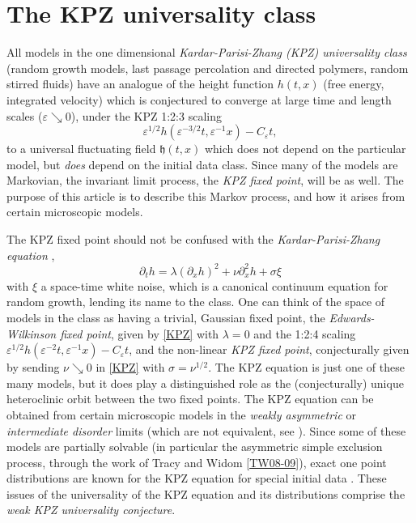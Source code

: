 \documentclass[letterpaper,reqno,11pt,oneside,final]{amsart}
\makeatletter
\newcommand{\citelink}[2]{\hyperlink{cite.\therefsection @#1}{#2}}
\theoremstyle{definition}
\newcommand{\fh}{\mathfrak{h}}
\newcommand{\ep}{\varepsilon}
\numberwithin{equation}{section}
\makeatother
\begin{document}
\maketitle
\tableofcontents


\section{The KPZ universality class}

All models in the one dimensional \emph{Kardar-Parisi-Zhang (KPZ) universality class} (random growth models, last passage percolation and directed polymers, random stirred fluids) have an analogue of the height function $h(t,x)$ (free energy, integrated velocity) which is conjectured to converge at large time and length scales ($\ep\searrow 0$), under the KPZ 1:2:3 scaling  
\begin{equation}\label{123}
\ep^{1/2} h(\ep^{-3/2} t, \ep^{-1} x) - C_\ep t, 
\end{equation}
to a universal fluctuating field $\fh(t,x)$ which does not depend on the particular model, but \emph{does} depend on the initial data class.  
Since many of the models are Markovian, the invariant limit process, the \emph{KPZ fixed point}, will be as well.
The purpose of this article is to describe this Markov process, and how it arises from certain microscopic models.

The KPZ fixed point should not be confused with the \emph{Kardar-Parisi-Zhang equation} \cite{kpz},
\begin{equation}\label{KPZ}
\partial_t h = \lambda(\partial_xh)^2    + \nu \partial_x^2h + \sigma \xi
\end{equation}
with $\xi$ a space-time white noise, which is a canonical continuum equation for random growth,  lending its name to the class.
One can think of the space of models in the class as having a trivial, Gaussian fixed point, the \emph{Edwards-Wilkinson fixed point}, given by \eqref{KPZ} with $\lambda=0$ and the 1:2:4 scaling $\ep^{1/2} h(\ep^{-2} t, \ep^{-1} x) - C_\ep t$, and the non-linear \emph{KPZ fixed point}, conjecturally given by sending $\nu\searrow 0$ in \eqref{KPZ} with $\sigma=\nu^{1/2}$.
The KPZ equation is just one of these many models, but it does play a distinguished role as the (conjecturally) unique heteroclinic orbit between the two fixed points.
The KPZ equation can be obtained from certain microscopic models in the \emph{weakly asymmetric} or \emph{intermediate disorder} limits \cite{berGiaco,akq2,mqrScaling,corwinTsai,corwinNica,corwinShenTsai} (which are not equivalent, see \cite{HQ}).
Since some of these models are partially solvable (in particular the asymmetric simple exclusion process, through the work of Tracy and Widom [\citelink{tracyWidomASEP1}{TW08-09}]), exact one point distributions are known for the KPZ equation for special initial data \cite{acq}.
These issues of the universality of the KPZ equation and its distributions comprise the \emph{weak KPZ universality conjecture}.
\nocite{tracyWidomASEP2,tracyWidomASEP1,tracyWidomASEP3}
\end{document}
